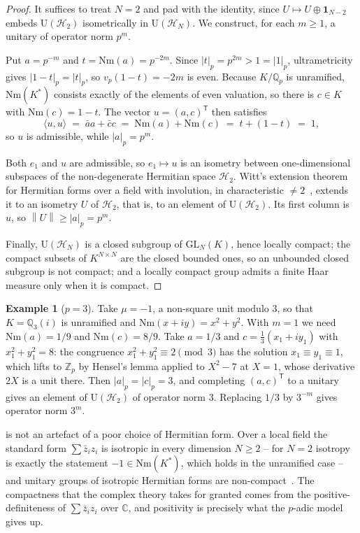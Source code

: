 \documentclass{ceurart}
\theoremstyle{plain}
\theoremstyle{definition}
\newtheorem{example}[theorem]{Example}
\theoremstyle{remark}
\theoremstyle{plain}
\newcommand{\Qp}{\mathbb{Q}_p}
\newcommand{\Zp}{\mathbb{Z}_p}
\newcommand{\padicnorm}[1]{\left|#1\right|_p}
\newcommand{\opnorm}[1]{\left\|#1\right\|}
\newcommand{\inner}[2]{\langle #1, #2\rangle}
\newcommand{\HH}{\mathcal{H}}
\newcommand{\Id}{\mathbf{1}}
\newcommand{\Uni}{\mathrm{U}}
\newcommand{\Nm}{\mathrm{Nm}}       %
\begin{document}
\begin{proof}
It suffices to treat $N=2$ and pad with the identity, since
$U\mapsto U\oplus\Id_{N-2}$ embeds $\Uni(\HH_2)$ isometrically in
$\Uni(\HH_N)$. We construct, for each $m\ge1$, a unitary of operator norm
$p^{m}$.

Put $a=p^{-m}$ and $t=\Nm(a)=p^{-2m}$. Since $\padicnorm t=p^{2m}>1=\padicnorm
1$, ultrametricity gives $\padicnorm{1-t}=\padicnorm t$, so $v_p(1-t)=-2m$ is
even. Because $K/\Qp$ is unramified, $\Nm(K^\ast)$ consists exactly of the
elements of even valuation, so there is $c\in K$ with $\Nm(c)=1-t$. The vector
$u=(a,c)^{\mathsf T}$ then satisfies
\[
  \inner uu \;=\; \bar aa+\bar cc\;=\;\Nm(a)+\Nm(c)\;=\;t+(1-t)\;=\;1 ,
\]
so $u$ is admissible, while $\padicnorm a=p^{m}$.

Both $e_1$ and $u$ are admissible, so $e_1\mapsto u$ is an isometry between
one-dimensional subspaces of the non-degenerate Hermitian space $\HH_2$. Witt's
extension theorem for Hermitian forms over a field with involution, in
characteristic $\ne2$~\cite[Ch.~7]{Gr02}, extends it to an isometry $U$ of
$\HH_2$, that is, to an element of $\Uni(\HH_2)$. Its first column is $u$, so
$\opnorm U\ge\padicnorm a=p^{m}$.

Finally, $\Uni(\HH_N)$ is a closed subgroup of $\mathrm{GL}_N(K)$, hence
locally compact; the compact subsets of $K^{N\times N}$ are the closed bounded
ones, so an unbounded closed subgroup is not compact; and a locally compact
group admits a finite Haar measure only when it is compact.
\end{proof}

\begin{example}[$p=3$]
\label{ex:p3}
Take $\mu=-1$, a non-square unit modulo $3$, so that $K=\mathbb{Q}_3(i)$ is
unramified and $\Nm(x+iy)=x^2+y^2$. With $m=1$ we need $\Nm(a)=1/9$ and
$\Nm(c)=8/9$. Take $a=1/3$ and $c=\tfrac13(x_1+iy_1)$ with $x_1^2+y_1^2=8$: the
congruence $x_1^2+y_1^2\equiv2\pmod3$ has the solution $x_1\equiv y_1\equiv1$,
which lifts to $\Zp$ by Hensel's lemma applied to $X^2-7$ at $X=1$, whose
derivative $2X$ is a unit there. Then $\padicnorm a=\padicnorm c=3$, and
completing $(a,c)^{\mathsf T}$ to a unitary gives an element of $\Uni(\HH_2)$
of operator norm $3$. Replacing $1/3$ by $3^{-m}$ gives operator norm $3^{m}$.
\end{example}

 is not an artefact of a poor choice of Hermitian form.
Over a local field the standard form $\sum\bar z_iz_i$ is isotropic in every
dimension $N\ge2$ -- for $N=2$ isotropy is exactly the statement
$-1\in \Nm(K^\ast)$, which holds in the unramified case -- and unitary groups
of isotropic Hermitian forms are non-compact~\cite[Ch.~3]{PR94}. The
compactness that the complex theory takes for granted comes from the
positive-definiteness of $\sum\bar z_iz_i$ over $\mathbb{C}$, and positivity is
precisely what the $p$-adic model gives up.
\end{document}
